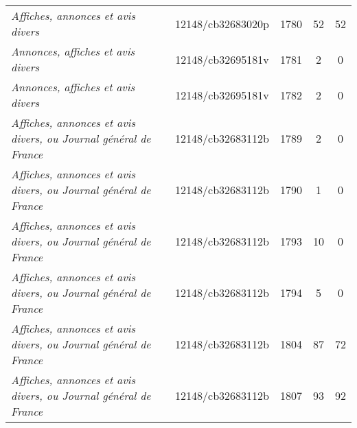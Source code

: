 \begin{table}[ht]
{\begin{tabular}{lcccc}
			\textit{Affiches, annonces et avis divers}                               & 12148/cb32683020p                             & 1780                                & 52                                                & 52                                              \\ 
			\textit{Annonces, affiches et avis divers}                               & 12148/cb32695181v                             & 1781                                & 2                                                 & 0                                               \\ 
			\textit{Annonces, affiches et avis divers}                               & 12148/cb32695181v                             & 1782                                & 2                                                 & 0                                               \\ 
			\textit{Affiches, annonces et avis divers, ou Journal général de France} & 12148/cb32683112b                             & 1789                                & 2                                                 & 0                                               \\ 
			\textit{Affiches, annonces et avis divers, ou Journal général de France} & 12148/cb32683112b                             & 1790                                & 1                                                 & 0                                               \\ 
			\textit{Affiches, annonces et avis divers, ou Journal général de France} & 12148/cb32683112b                             & 1793                                & 10                                                & 0                                               \\ 
			\textit{Affiches, annonces et avis divers, ou Journal général de France} & 12148/cb32683112b                             & 1794                                & 5                                                 & 0                                               \\ 
			\textit{Affiches, annonces et avis divers, ou Journal général de France} & 12148/cb32683112b                             & 1804                                & 87                                                & 72                                              \\ 
			\textit{Affiches, annonces et avis divers, ou Journal général de France} & 12148/cb32683112b                             & 1807                                & 93                                                & 92                                              \\ 

\end{tabular}}
\end{table}
